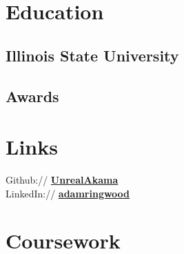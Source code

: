 \documentclass[letterpaper]{deedy-resume} %
\begin{document}
\begin{minipage}[t]{0.33\textwidth} %


\section{Education} 

\subsection{Illinois State University}

\sectionspace %


\sectionspace %


\subsection{Awards}


\sectionspace %


\section{Links} 

Github:// \href{https://github.com/UnrealAkama}{\bf UnrealAkama} \\
LinkedIn:// \href{https://www.linkedin.com/in/adamringwood}{\bf adamringwood} \\

\sectionspace %


\section{Coursework}


\end{minipage}
\end{document}
